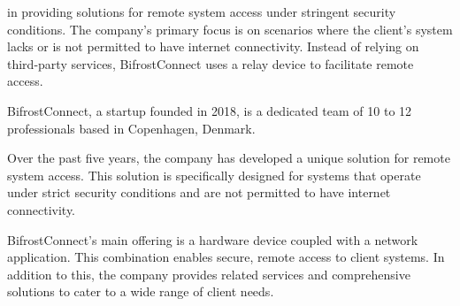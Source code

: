





in providing solutions for remote system access under stringent security conditions. The company's primary focus is on scenarios where the client's system lacks or is not permitted to have internet connectivity. Instead of relying on third-party services, BifrostConnect uses a relay device to facilitate remote access.

BifrostConnect, a startup founded in 2018, 
is a dedicated team of 10 to 12 professionals based in Copenhagen, Denmark.

Over the past five years, 
the company has developed a unique solution for remote system access. 
This solution is specifically designed for systems that operate 
under strict security conditions and are not permitted to have internet connectivity.

BifrostConnect's main offering is a hardware device coupled with a network application. 
This combination enables secure, remote access to client systems. 
In addition to this, the company provides related services 
and comprehensive solutions to cater to a wide range of client needs.